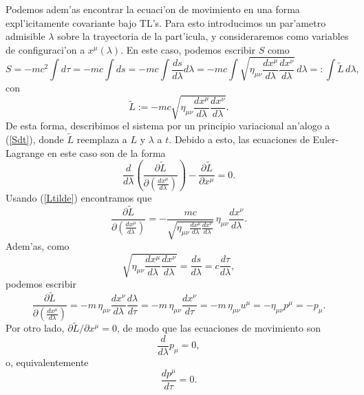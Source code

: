 Podemos adem'as encontrar la ecuaci'on de movimiento en una forma expl'icitamente
covariante bajo TL's. Para esto introducimos un par'ametro admisible $\lambda$
sobre la trayectoria de la part'icula, y consideraremos como variables de
configuraci'on a $x^\mu(\lambda)$. En este caso, podemos escribir $S$ como
\begin{equation}
S=-mc^2\int  d\tau=-mc\int  ds=-mc\int  \frac{ds}{d\lambda}d\lambda=-mc\int
\sqrt{\eta_{\mu\nu}\frac{dx^\mu}{d\lambda}\frac{dx^\nu}{d\lambda}}\,
d\lambda=:\int  \tilde{L}\,d\lambda,
\end{equation}
con
\begin{equation}
\tilde{L}:=-mc\sqrt{\eta_{\mu\nu}\frac{dx^\mu}{d\lambda}\frac{dx^\nu}{d\lambda}}
. \label{Ltilde}
\end{equation}
De esta forma, describimos el sistema por un principio variacional an'alogo a
(\ref{Sdt}), donde $\tilde{L}$ reemplaza a $L$ y $\lambda$ a $t$. Debido a esto,
las ecuaciones de Euler-Lagrange en este caso son de la forma
\begin{equation}
\frac{d}{d\lambda}\left(  \frac{\partial
\tilde{L}}{\partial\left(\frac{dx^\mu}{d\lambda}\right) }\right)-\frac{\partial
\tilde{L}}{\partial x^\mu}=0.
\end{equation}
Usando (\ref{Ltilde}) encontramos que
\begin{equation}
 \frac{\partial \tilde{L}}{\partial\left(\frac{dx^\mu}{d\lambda}\right)
}=-\frac{mc}{\sqrt{\eta_{\mu\nu}\frac{dx^\mu}{d\lambda}\frac{dx^\nu}{d\lambda}}}
\,\eta_{\mu\nu}\frac{dx^\nu}{d\lambda}.
\end{equation}
Adem'as, como
\begin{equation}
\sqrt{\eta_{\mu\nu}\frac{dx^\mu}{d\lambda}\frac{dx^\nu}{d\lambda}}=\frac{ds}{
d\lambda}=c\frac{d\tau}{d\lambda},
\end{equation}
podemos escribir
\begin{equation}
 \frac{\partial \tilde{L}}{\partial\left(\frac{dx^\mu}{d\lambda}\right)
}=-m\,\eta_{\mu\nu}\frac{dx^\nu}{d\lambda}\frac{d\lambda}{d\tau}=-m\,\eta_{
\mu\nu}\frac{dx^\nu}{d\tau}=-m\,\eta_{\mu\nu}u^\mu=-\eta_{\mu\nu}p^\mu=-p_\mu.
\end{equation}
Por otro lado, ${\partial \tilde{L}}/{\partial x^\mu}=0$, de modo que las
ecuaciones de movimiento son
\begin{equation}
\frac{d}{d\lambda}p_\mu=0,
\end{equation}
o, equivalentemente
\begin{equation}
\frac{dp^\mu}{d\tau}  =0.
\end{equation}

